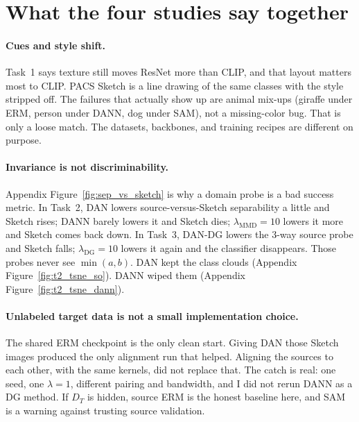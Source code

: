 \documentclass{article}
\begin{document}
\begin{table}[t]
  \centering
  \caption{Trained-model comparison.
  CSA uses only the ten known logits.
  The last row is PROSER's placeholder detector, not MLS.}
  \label{tab:t4_models}
  \small\setlength{\tabcolsep}{3pt}
  
\end{table}

\begin{table}[t]
  \centering
  \caption{False accepts of Vanilla MLS at the val-calibrated $\tau$.
  Near failures are neighbor classes.
  Far failures are not.}
  \label{tab:t4_failures}
  \small
  
\end{table}

\section{What the four studies say together}
\label{sec:discussion}

\paragraph{Cues and style shift.}
Task~1 says texture still moves ResNet more than CLIP, and that layout matters most to CLIP.
PACS Sketch is a line drawing of the same classes with the style stripped off.
The failures that actually show up are animal mix-ups (giraffe under ERM, person under DANN, dog under SAM), not a missing-color bug.
That is only a loose match. The datasets, backbones, and training recipes are different on purpose.

\paragraph{Invariance is not discriminability.}
Appendix Figure~\ref{fig:sep_vs_sketch} is why a domain probe is a bad success metric.
In Task~2, DAN lowers source-versus-Sketch separability a little and Sketch rises; DANN barely lowers it and Sketch dies; $\lambda_{\mathrm{MMD}}=10$ lowers it more and Sketch comes back down.
In Task~3, DAN-DG lowers the $3$-way source probe and Sketch falls; $\lambda_{\mathrm{DG}}=10$ lowers it again and the classifier disappears.
Those probes never see $\min(a,b)$.
DAN kept the class clouds (Appendix Figure~\ref{fig:t2_tsne_so}). DANN wiped them (Appendix Figure~\ref{fig:t2_tsne_dann}).

\paragraph{Unlabeled target data is not a small implementation choice.}
The shared ERM checkpoint is the only clean start.
Giving DAN those Sketch images produced the only alignment run that helped.
Aligning the sources to each other, with the same kernels, did not replace that.
The catch is real: one seed, one $\lambda=1$, different pairing and bandwidth, and I did not rerun DANN as a DG method.
If $D_T$ is hidden, source ERM is the honest baseline here, and SAM is a warning against trusting source validation.
\end{document}
